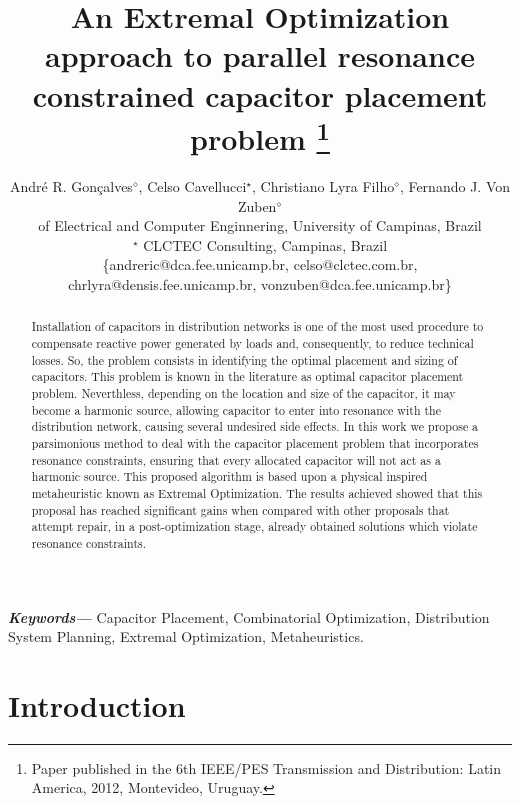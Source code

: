\documentclass[11pt]{article}
\providecommand{\keywords}[1]{\textbf{\textit{Keywords---}} #1}
\begin{document}
\title{An Extremal Optimization approach to parallel resonance constrained capacitor placement problem
\footnote{Paper published in the 6th IEEE/PES Transmission and Distribution: Latin America, 2012, Montevideo, Uruguay.}}

\author{Andr\'e R. Gon\c{c}alves{${}^\diamond$}, 
 Celso Cavellucci{${}^\star$},\; Christiano Lyra Filho{${}^\diamond$}, 
Fernando J. Von Zuben{${}^\diamond$}\;
\\ \mathSchool of Electrical and Computer Enginnering, University of Campinas, Brazil
\\{${}^\star$} CLCTEC Consulting, Campinas, Brazil\\
{\footnotesize \{andreric@dca.fee.unicamp.br, celso@clctec.com.br,} \\{\footnotesize chrlyra@densis.fee.unicamp.br, vonzuben@dca.fee.unicamp.br\}} }
\date{}
\maketitle
\begin{abstract}
Installation of capacitors in distribution networks is one 
of the most used procedure to compensate reactive power generated by 
loads and, consequently, to reduce technical losses.
So, the problem consists in identifying the optimal placement and sizing
of capacitors. This problem is known in the literature 
as optimal capacitor placement problem. Neverthless, 
depending on the location and size of the capacitor, it 
may become a harmonic source, allowing capacitor to enter 
into resonance with the distribution network, causing several undesired
side effects. In this work we propose a parsimonious method
to deal with the capacitor placement problem that incorporates resonance
constraints, ensuring that every allocated capacitor will not
act as a harmonic source. This proposed algorithm is based upon a
physical inspired metaheuristic known as Extremal Optimization.
The results achieved showed that this proposal has reached 
significant gains when compared with other proposals that attempt
repair, in a post-optimization stage, already obtained solutions
which violate resonance constraints.
\end{abstract}

\keywords{Capacitor Placement, Combinatorial Optimization, Distribution System Planning, Extremal Optimization, Metaheuristics.}

\section{Introduction}
\label{sec:intro}
\end{document}
